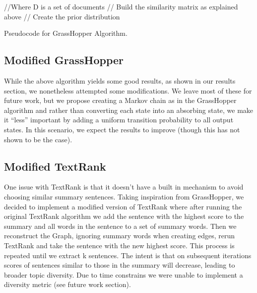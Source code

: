 \documentclass[11pt]{article}
\begin{document}
\begin{algorithm}
  \begin{algorithmic}
     //Where D is a set of documents
     // Build the similarity matrix as explained above
     // Create the prior distribution
    \EndWhile{}
    \EndProcedure{}
  \end{algorithmic}
  \caption{Pseudocode for GrassHopper Algorithm.}
\end{algorithm}


\subsection{Modified GrassHopper}
While the above algorithm yields some good results, as shown in our results section, we nonetheless attempted some modifications. We leave most of these for future work, but we propose creating a Markov chain as in the GrassHopper algorithm and rather than converting each state into an absorbing state, we make it ``less'' important by adding a uniform transition probability to all output states. In this scenario, we expect the results to improve (though this has not shown to be the case).

\subsection{Modified TextRank}
One issue with TextRank is that it doesn't have a built in mechanism to avoid choosing similar summary sentences. Taking inspiration from GrassHopper, we decided to implement a modified version of TextRank where after running the original TextRank algorithm we add the sentence with the highest score to the summary and all words in the sentence to a set of summary words. Then we reconstruct the Graph, ignoring summary words when creating edges, rerun TextRank and take the sentence with the new highest score. This process is repeated until we extract k sentences. The intent is that on subsequent iterations scores of sentences similar to those in the summary will decrease, leading to broader topic diversity. Due to time constrains we were unable to implement a diversity metric (see future work section).
\end{document}
